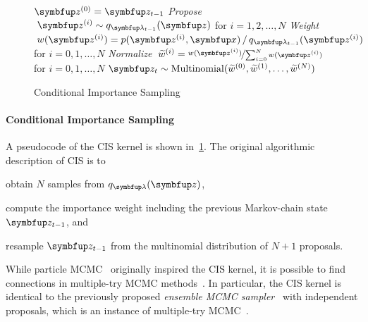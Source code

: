 \begin{figure}[H]
  \vspace{-0.1in}
  \small
  \begin{algorithm2e}[H]
    \DontPrintSemicolon
    \SetAlgoLined
    \(\vz^{(0)} = \vz_{t-1}\) \;
    \textit{Propose} \(\;\vz^{(i)} \sim q_{\vlambda_{t-1}}(\vz)\) for \(i = 1, 2,\ldots, N\) \;
    \textit{Weight} \(\;w(\vz^{(i)}) = p(\vz^{(i)},\vx) \,/\, q_{\vlambda_{t-1}}(\vz^{(i)}) \) for \(i = 0, 1,\ldots, N\)\;
    \textit{Normalize} \(\;\widetilde{w}^{(i)} = \nicefrac{w(\vz^{(i)})}{ \sum^{N}_{i=0} w(\vz^{(i)}) }\) for \(i = 0, 1,\ldots, N\)\;
    \(\vz_{t} \sim \mathrm{Multinomial}(\widetilde{w}^{(0)}, \widetilde{w}^{(1)}, \ldots, \widetilde{w}^{(N)}) \)\;
    \caption{Conditional Importance Sampling}\label{alg:cis}
  \end{algorithm2e}
  \vspace{-0.2in}
\end{figure}
%
\vspace{-0.1in}
\paragraph{Conditional Importance Sampling}
A pseudocode of the CIS kernel is shown in~\cref{alg:cis}.
The original algorithmic description of CIS is to
\begin{enumerate*}[label=(\roman*)]
  \item obtain \(N\) samples from \(q_{\vlambda}(\vz)\),
  \item compute the importance weight including the previous Markov-chain state \(\vz_{t-1}\), and 
  \item resample \(\vz_{t-1}\) from the multinomial distribution of \(N+1\) proposals.
\end{enumerate*}
%
While particle MCMC~\citep{andrieu_particle_2010} originally inspired the CIS kernel, it is possible to find connections in multiple-try MCMC methods~\citep{martino_review_2018}.
In particular, the CIS kernel is identical to the previously proposed \textit{ensemble MCMC sampler}~\citep{austad_parallel_2007, neal_mcmc_2011a} with independent proposals, which is an instance of multiple-try MCMC~\citep[Table 12]{martino_review_2018}.

\vspace{-0.1in}

